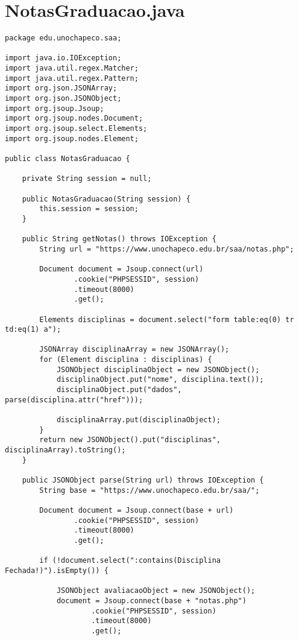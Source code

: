 \section{NotasGraduacao.java}
\begin{lstlisting}
package edu.unochapeco.saa;

import java.io.IOException;
import java.util.regex.Matcher;
import java.util.regex.Pattern;
import org.json.JSONArray;
import org.json.JSONObject;
import org.jsoup.Jsoup;
import org.jsoup.nodes.Document;
import org.jsoup.select.Elements;
import org.jsoup.nodes.Element;

public class NotasGraduacao {

    private String session = null;

    public NotasGraduacao(String session) {
        this.session = session;
    }

    public String getNotas() throws IOException {
        String url = "https://www.unochapeco.edu.br/saa/notas.php";

        Document document = Jsoup.connect(url)
                .cookie("PHPSESSID", session)
                .timeout(8000)
                .get();

        Elements disciplinas = document.select("form table:eq(0) tr td:eq(1) a");

        JSONArray disciplinaArray = new JSONArray();
        for (Element disciplina : disciplinas) {
            JSONObject disciplinaObject = new JSONObject();
            disciplinaObject.put("nome", disciplina.text());
            disciplinaObject.put("dados", parse(disciplina.attr("href")));

            disciplinaArray.put(disciplinaObject);
        }
        return new JSONObject().put("disciplinas", disciplinaArray).toString();
    }

    public JSONObject parse(String url) throws IOException {
        String base = "https://www.unochapeco.edu.br/saa/";

        Document document = Jsoup.connect(base + url)
                .cookie("PHPSESSID", session)
                .timeout(8000)
                .get();

        if (!document.select(":contains(Disciplina Fechada!)").isEmpty()) {

            JSONObject avaliacaoObject = new JSONObject();
            document = Jsoup.connect(base + "notas.php")
                    .cookie("PHPSESSID", session)
                    .timeout(8000)
                    .get();


\end{lstlisting}
